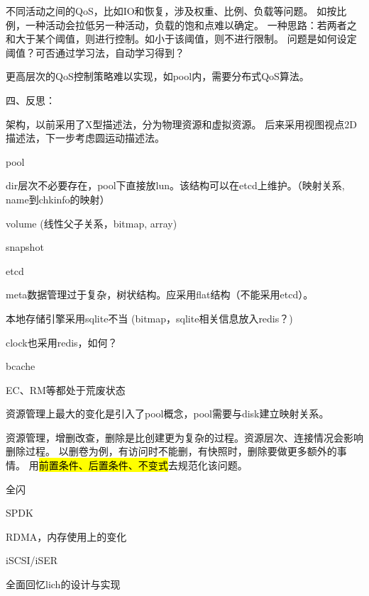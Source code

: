 不同活动之间的QoS，比如IO和恢复，涉及权重、比例、负载等问题。
如按比例，一种活动会拉低另一种活动，负载的饱和点难以确定。
一种思路：若两者之和大于某个阈值，则进行控制。如小于该阈值，则不进行限制。
问题是如何设定阈值？可否通过学习法，自动学习得到？

更高层次的QoS控制策略难以实现，如pool内，需要分布式QoS算法。

四、反思：

架构，以前采用了X型描述法，分为物理资源和虚拟资源。
后来采用视图视点2D描述法，下一步考虑圆运动描述法。

\begin{enumbox}
\item pool
\item dir层次不必要存在，pool下直接放lun。该结构可以在etcd上维护。（映射关系, name到chkinfo的映射）
\item volume (线性父子关系，bitmap, array)
\item snapshot
\item *
\item etcd
\item meta数据管理过于复杂，树状结构。应采用flat结构（不能采用etcd）。
\item 本地存储引擎采用sqlite不当 (bitmap，sqlite相关信息放入redis？)
\item clock也采用redis，如何？
\item *
\item bcache
\item EC、RM等都处于荒废状态
\end{enumbox}

资源管理上最大的变化是引入了pool概念，pool需要与disk建立映射关系。

资源管理，增删改查，删除是比创建更为复杂的过程。资源层次、连接情况会影响删除过程。
以删卷为例，有访问时不能删，有快照时，删除要做更多额外的事情。
用\hl{前置条件、后置条件、不变式}去规范化该问题。

全闪
\begin{enumbox}
\item SPDK
\item RDMA，内存使用上的变化
\item iSCSI/iSER
\end{enumbox}

全面回忆lich的设计与实现
